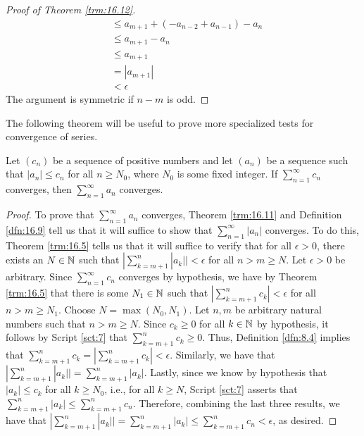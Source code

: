 \documentclass[../main.tex]{subfiles}
\begin{document}
\begin{theorem}
\begin{proof}[Proof of Theorem \ref{trm:16.12}]
\begin{align*}
            &\leq a_{m+1}+(-a_{n-2}+a_{n-1})-a_n\tag*{Lemma (c)}\\
            &\leq a_{m+1}-a_n\tag*{Lemma (c)}\\
            &\leq a_{m+1}\\
            &= |a_{m+1}|\\
            &< \epsilon
        \end{align*}
        The argument is symmetric if $n-m$ is odd.
    \end{proof}
\end{theorem}

The following theorem will be useful to prove more specialized tests for convergence of series.

\begin{theorem}\label{trm:16.13}
    Let $(c_n)$ be a sequence of positive numbers and let $(a_n)$ be a sequence such that $|a_n|\leq c_n$ for all $n\geq N_0$, where $N_0$ is some fixed integer. If $\sum_{n=1}^\infty c_n$ converges, then $\sum_{n=1}^\infty a_n$ converges.
    \begin{proof}
        To prove that $\sum_{n=1}^\infty a_n$ converges, Theorem \ref{trm:16.11} and Definition \ref{dfn:16.9} tell us that it will suffice to show that $\sum_{n=1}^\infty|a_n|$ converges. To do this, Theorem \ref{trm:16.5} tells us that it will suffice to verify that for all $\epsilon>0$, there exists an $N\in\mathbb{N}$ such that $|\sum_{k=m+1}^n|a_k||<\epsilon$ for all $n>m\geq N$. Let $\epsilon>0$ be arbitrary. Since $\sum_{n=1}^\infty c_n$ converges by hypothesis, we have by Theorem \ref{trm:16.5} that there is some $N_1\in\mathbb{N}$ such that $|\sum_{k=m+1}^nc_k|<\epsilon$ for all $n>m\geq N_1$. Choose $N=\max(N_0,N_1)$. Let $n,m$ be arbitrary natural numbers such that $n>m\geq N$. Since $c_k\geq 0$ for all $k\in\mathbb{N}$ by hypothesis, it follows by Script \ref{sct:7} that $\sum_{k=m+1}^nc_k\geq 0$. Thus, Definition \ref{dfn:8.4} implies that $\sum_{k=m+1}^nc_k=|\sum_{k=m+1}^nc_k|<\epsilon$. Similarly, we have that $|\sum_{k=m+1}^n|a_k||=\sum_{k=m+1}^n|a_k|$. Lastly, since we know by hypothesis that $|a_k|\leq c_k$ for all $k\geq N_0$, i.e., for all $k\geq N$, Script \ref{sct:7} asserts that $\sum_{k=m+1}^n|a_k|\leq\sum_{k=m+1}^nc_n$. Therefore, combining the last three results, we have that $|\sum_{k=m+1}^n|a_k||=\sum_{k=m+1}^n|a_k|\leq\sum_{k=m+1}^nc_n<\epsilon$, as desired.
    \end{proof}
\end{theorem}
\end{document}
